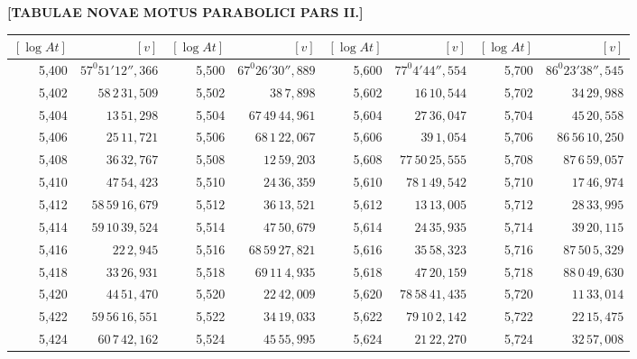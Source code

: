 \clearpage
{}
\begingroup
\centering
\fontsize{9}{9}\selectfont
\setlength{\tabcolsep}{1.25pt}
\renewcommand{\arraystretch}{.9}
\setlength{\parskip}{0pt}
\textbf{[TABULAE NOVAE MOTUS PARABOLICI PARS II.]}
\par\vspace{7pt}
\begin{tabular}{|r|r||r|r||r|r||r|r|}
\hline
\([\log At]\) & \([v]\) & \([\log At]\) & \([v]\) & \([\log At]\) & \([v]\) & \([\log At]\) & \([v]\) \\
\hline
5,400 & \(57^{0}51'12'',\!366\) & 5,500 & \(67^{0}26'30'',\!889\) & 5,600 & \(77^{0}4'44'',\!554\) & 5,700 & \(86^{0}23'38'',\!545\) \\[1pt]
5,402 & \(58\,2\,31,\!509\) & 5,502 & \(38\,7,\!898\) & 5,602 & \(16\,10,\!544\) & 5,702 & \(34\,29,\!988\) \\
5,404 & \(13\,51,\!298\) & 5,504 & \(67\,49\,44,\!961\) & 5,604 & \(27\,36,\!047\) & 5,704 & \(45\,20,\!558\) \\
5,406 & \(25\,11,\!721\) & 5,506 & \(68\,1\,22,\!067\) & 5,606 & \(39\,1,\!054\) & 5,706 & \(86\,56\,10,\!250\) \\
5,408 & \(36\,32,\!767\) & 5,508 & \(12\,59,\!203\) & 5,608 & \(77\,50\,25,\!555\) & 5,708 & \(87\,6\,59,\!057\) \\
5,410 & \(47\,54,\!423\) & 5,510 & \(24\,36,\!359\) & 5,610 & \(78\,1\,49,\!542\) & 5,710 & \(17\,46,\!974\) \\[1pt]
5,412 & \(58\,59\,16,\!679\) & 5,512 & \(36\,13,\!521\) & 5,612 & \(13\,13,\!005\) & 5,712 & \(28\,33,\!995\) \\
5,414 & \(59\,10\,39,\!524\) & 5,514 & \(47\,50,\!679\) & 5,614 & \(24\,35,\!935\) & 5,714 & \(39\,20,\!115\) \\
5,416 & \(22\,2,\!945\) & 5,516 & \(68\,59\,27,\!821\) & 5,616 & \(35\,58,\!323\) & 5,716 & \(87\,50\,5,\!329\) \\
5,418 & \(33\,26,\!931\) & 5,518 & \(69\,11\,4,\!935\) & 5,618 & \(47\,20,\!159\) & 5,718 & \(88\,0\,49,\!630\) \\
5,420 & \(44\,51,\!470\) & 5,520 & \(22\,42,\!009\) & 5,620 & \(78\,58\,41,\!435\) & 5,720 & \(11\,33,\!014\) \\[1pt]
5,422 & \(59\,56\,16,\!551\) & 5,522 & \(34\,19,\!033\) & 5,622 & \(79\,10\,2,\!142\) & 5,722 & \(22\,15,\!475\) \\
5,424 & \(60\,7\,42,\!162\) & 5,524 & \(45\,55,\!995\) & 5,624 & \(21\,22,\!270\) & 5,724 & \(32\,57,\!008\) \\

\end{tabular}
